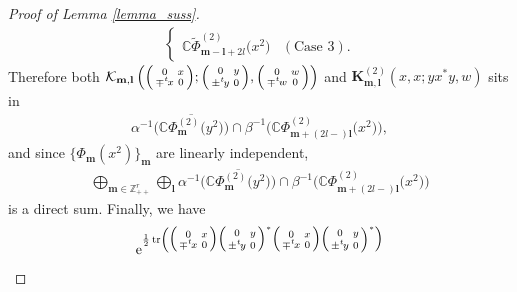 \documentclass[pdftex]{sigma}
\numberwithin{equation}{section}
\newcommand{\bK}{\mathbf{K}}
\newcommand{\bl}{\mathbf{l}}
\newcommand{\bm}{\mathbf{m}}
\newcommand{\BZ}{\mathbb{Z}}
\newcommand{\BC}{\mathbb{C}}
\newcommand{\cK}{\mathcal{K}}
\newcommand{\tr}{\operatorname{tr}}
\begin{document}
\begin{proof}[Proof of Lemma \ref{lemma_suss}]
\begin{gather*}
\begin{cases}
\BC\tilde{\Phi}_{\bm-\bl+2l}^{(2)}\big(x^2\big) & (\text{Case }3). \end{cases}
\end{gather*}
Therefore both $\cK_{\bm,\bl}\left(\Big(\begin{smallmatrix}0&x\\ \mp{}^t\hspace{-1pt}x&0\end{smallmatrix}\Big);
\Big(\begin{smallmatrix}0&y\\ \pm{}^t\hspace{-1pt}y&0\end{smallmatrix}\Big),
\Big(\begin{smallmatrix}0&w\\ \mp{}^t\hspace{-1pt}w&0\end{smallmatrix}\Big)\right)$
and $\bK_{\bm,\bl}^{(2)}(x,x;yx^*y,w)$ sits in
\begin{gather*} \alpha^{-1}\big(\overline{\BC\Phi_\bm^{(2)}\big(y^2\big)}\big)\cap \beta^{-1}\big(\BC\Phi_{\bm+(2l-)\bl}^{(2)}\big(x^2\big)\big), \end{gather*}
and since $\{\Phi_\bm(x^2)\}_\bm$ are linearly independent,
\begin{gather*} \bigoplus_{\bm\in\BZ_{++}^r}\bigoplus_\bl
\alpha^{-1}\big(\overline{\BC\Phi_\bm^{(2)}\big(y^2\big)}\big)\cap \beta^{-1}\big(\BC\Phi_{\bm+(2l-)\bl}^{(2)}\big(x^2\big)\big) \end{gather*}
is a direct sum. Finally, we have
\begin{gather*}
 {\rm e}^{\frac{1}{2}\tr\left(\Big(\begin{smallmatrix}0&x\\ \mp{}^t\hspace{-1pt}x&0\end{smallmatrix}\Big)
\Big(\begin{smallmatrix}0&y\\ \pm{}^t\hspace{-1pt}y&0\end{smallmatrix}\Big)^*
\Big(\begin{smallmatrix}0&x\\ \mp{}^t\hspace{-1pt}x&0\end{smallmatrix}\Big)
\Big(\begin{smallmatrix}0&y\\ \pm{}^t\hspace{-1pt}y&0\end{smallmatrix}\right)^*\Big)}

\end{gather*}
\end{proof}
\end{document}
